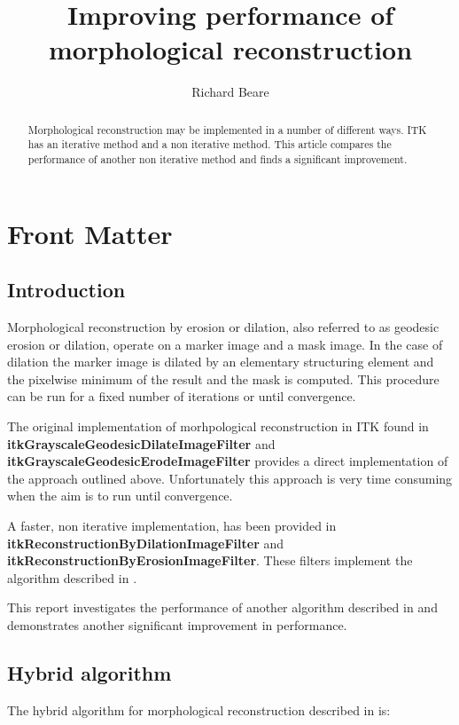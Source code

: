 \documentclass{InsightArticle}
\title{Improving performance of morphological reconstruction}
\author{Richard Beare}
\begin{document}
\maketitle

\ifhtml
\chapter*{Front Matter\label{front}}
\fi


\begin{abstract}
\noindent
Morphological reconstruction may be implemented in a number of
different ways. ITK has an iterative method and a non iterative
method. This article compares the performance of another non iterative
method and finds a significant improvement.
\end{abstract}

\tableofcontents

\section{Introduction}
Morphological reconstruction by erosion or dilation, also referred to
as geodesic erosion or dilation, operate on a marker image and a mask
image. In the case of dilation the marker image is dilated by an
elementary structuring element and the pixelwise minimum of the result
and the mask is computed. This procedure can be run for a fixed number
of iterations or until convergence.

The original implementation of morhpological reconstruction in ITK
found in {\bf itkGrayscaleGeodesicDilateImageFilter} and {\bf
itkGrayscaleGeodesicErodeImageFilter} provides a direct implementation
of the approach outlined above. Unfortunately this approach is very
time consuming when the aim is to run until convergence.

A faster, non iterative implementation, has been provided in {\bf
itkReconstructionByDilationImageFilter} and {\bf
itkReconstructionByErosionImageFilter}. These filters implement the
algorithm described in \cite{Robinson2004a}.

This report investigates the performance of another algorithm
described in \cite{Vincent93a} and demonstrates another significant
improvement in performance.

\section{Hybrid algorithm}
The hybrid algorithm for morphological reconstruction described in \cite{Vincent93a} is:
\end{document}
